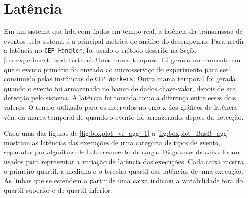 \newpage


\section{Latência}
\label{sec:latency}







Em um sistema que lida com dados em tempo real, a latência da transmissão de eventos pelo sistema é a principal métrica de análise do desempenho. Para medir a latência no \texttt{CEP Handler}, foi usado o método descrito na Seção  \ref{sec:experiment_architecture}. Uma marca temporal foi gerada no momento em que o evento primário foi enviado do microsserviço do experimento para ser consumido pelas instâncias de \texttt{CEP Workers}. Outra marca temporal foi gerada quando o evento foi armazenado no banco de dados chave-valor, depois de sua detecção pelo sistema. A latência foi tomada como a diferença entre esses dois valores. O tempo utilizado para os intervalos no eixo x dos gráficos de latência vêm da marca temporal de quando o evento foi armazenado, depois da detecção. 

Cada uma das figuras de \ref{fig:boxplot_vf_agg_1} a \ref{fig:boxplot_BusB_agg} mostram as latências das execuções de uma categoria de tipos de evento, separadas por algoritmo de balanceamento de carga. Diagramas de caixa foram usados para representar a variação de latência das execuções. Cada caixa mostra o primeiro quartil, a mediana e o terceiro quartil das latências de uma execução.  As linhas que se estendem a partir de uma caixa indicam a variabilidade fora do quartil superior e do quartil inferior. 

